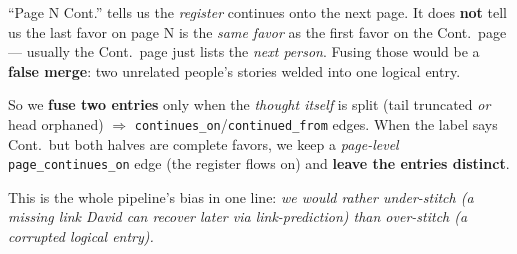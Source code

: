 \documentclass[11pt]{article}
\newcommand{\code}[1]{\texttt{\small #1}}
\begin{document}
\begin{rulebox}
``Page N Cont.'' tells us the \emph{register} continues onto the next page. It does \textbf{not} tell
us the last favor on page N is the \emph{same favor} as the first favor on the Cont.\ page --- usually
the Cont.\ page just lists the \emph{next person}. Fusing those would be a \textbf{false merge}: two
unrelated people's stories welded into one logical entry.

\medskip
So we \textbf{fuse two entries} only when the \emph{thought itself} is split (tail truncated
\emph{or} head orphaned) $\Rightarrow$ \code{continues\_on}/\code{continued\_from} edges. When the
label says Cont.\ but both halves are complete favors, we keep a \emph{page-level}
\code{page\_continues\_on} edge (the register flows on) and \textbf{leave the entries distinct}.
\end{rulebox}

\noindent This is the whole pipeline's bias in one line: \emph{we would rather under-stitch (a missing
link David can recover later via link-prediction) than over-stitch (a corrupted logical entry).}

\begin{center}
\end{center}
\end{document}

